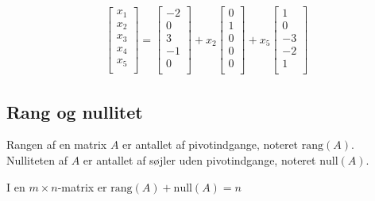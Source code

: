 \begin{eks}
\begin{align*}
\begin{bmatrix}
           x_{1} \\
           x_{2} \\
           x_{3} \\
           x_{4} \\
           x_{5} \\
         \end{bmatrix} 
         = \begin{bmatrix}
           -2 \\
           0 \\
           3 \\
           -1 \\
           0 \\
         \end{bmatrix}
         +x_2 \begin{bmatrix}
           0 \\
           1 \\
           0 \\
           0 \\
           0 \\
         \end{bmatrix}
         +x_5 \begin{bmatrix}
           1 \\
           0 \\
           -3 \\
           -2 \\
           1 \\
         \end{bmatrix}
  \end{align*} 
\label{eks_gauss}
\end{eks}
%
\subsection{Rang og nullitet}
\begin{defn}{}{}
Rangen af en matrix $A$ er antallet af pivotindgange, noteret $\text{rang}(A)$. \\
Nulliteten af $A$ er antallet af søjler uden pivotindgange, noteret $\text{null}(A)$.
\end{defn}
%
I en $m \times n$-matrix er $\text{rang}(A)+\text{null}(A)=n$

